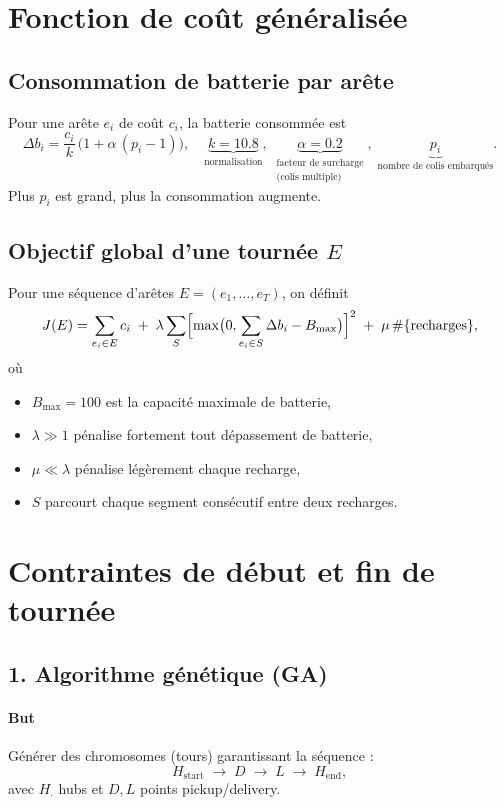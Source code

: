 \documentclass[11pt,a4paper]{article}
\begin{document}
\section{Fonction de coût généralisée}
\subsection{Consommation de batterie par arête}
Pour une arête \(e_i\) de coût \(c_i\), la batterie consommée est
\[
  \Delta b_i
  = \frac{c_i}{k}\,\bigl(1 + \alpha\,(p_i - 1)\bigr),
  \quad
  \underbrace{k=10.8}_{\text{normalisation}},\;
  \underbrace{\alpha=0.2}_{\substack{\text{facteur de surcharge}\\\text{(colis multiple)}}},\;
  \underbrace{p_i}_{\text{nombre de colis embarqués}}.
\]
Plus \(p_i\) est grand, plus la consommation augmente.

\subsection{Objectif global d'une tournée \texorpdfstring{\(E\)}{E}}
Pour une séquence d'arêtes \(E=(e_1,\dots,e_T)\), on définit
\[
  J(E)
  =
  \sum_{e_i\in E} c_i
  \;+\;
  \lambda
  \sum_{S}
    \Bigl[\max\bigl(0,\sum_{e_i\in S}\Delta b_i - B_{\max}\bigr)\Bigr]^2
  \;+\;
  \mu\,\#\{\text{recharges}\},
\]
où
\begin{itemize}
  \item \(B_{\max}=100\) est la capacité maximale de batterie,
  \item \(\lambda\gg1\) pénalise fortement tout dépassement de batterie,
  \item \(\mu\ll\lambda\) pénalise légèrement chaque recharge,
  \item \(S\) parcourt chaque segment consécutif entre deux recharges.
\end{itemize}

\section{Contraintes de début et fin de tournée}

\subsection{1. Algorithme génétique (GA)}
\label{subsec:GA_constraints}

\paragraph{But} Générer des chromosomes (tours) garantissant la séquence :
\[
  H_{\text{start}} \;\to\; D \;\to\; L \;\to\; H_{\text{end}},
\]
avec \(H_{\cdot}\) hubs et \(D,L\) points pickup/delivery.
\end{document}
